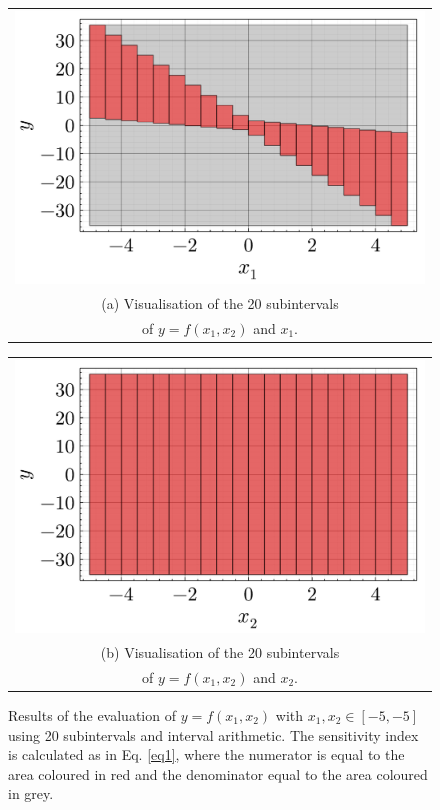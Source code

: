 \documentclass[twocolumn]{rps-esrel2022}
\begin{document}
\begin{figure}[!b]
	\centering
	\begin{tabular}{@{}c@{}}
	  \includegraphics[width=0.94\linewidth]{figures/example_boxes_1.pdf} \\
	  \small (a) Visualisation of the 20 subintervals\\
	  \small of $y=f(x_1,x_2)$ and $x_1$.
	\end{tabular}

	\begin{tabular}{@{}c@{}}
	  \includegraphics[width=0.94\linewidth]{figures/example_boxes_2.pdf} \\
	  \small (b) Visualisation of the 20 subintervals\\
	  \small of $y=f(x_1,x_2)$ and $x_2$.
	\end{tabular}

	\caption{Results of the evaluation of $y=f(x_1,x_2)$ with $x_1,x_2 \in [-5,-5]$ using 20 subintervals and interval arithmetic.
	The sensitivity index is calculated as in Eq. \ref{eq1}, where the numerator is equal to the area coloured in red and the denominator
	equal to the area coloured in grey.}
	\label{fig:myfig}
\end{figure}
\end{document}
